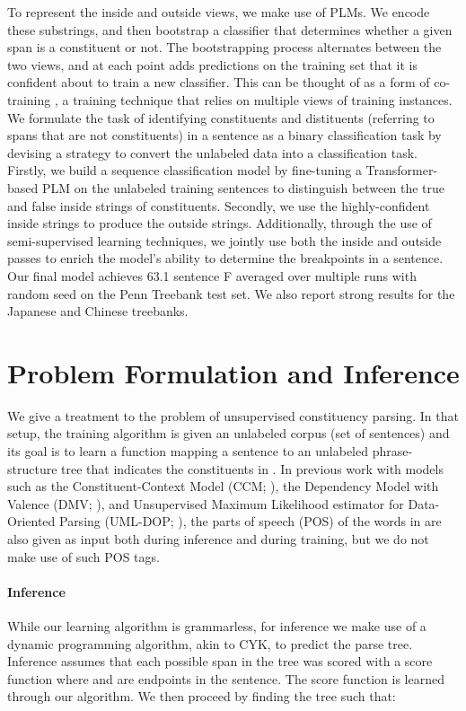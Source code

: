 \documentclass[11pt]{article}
\begin{document}
To represent the inside and outside views, we make use of PLMs. We encode these substrings, and then bootstrap a classifier that determines whether a given span is a constituent or not. The bootstrapping process alternates between the two views, and at each point adds predictions on the training set that it is confident about to train a new classifier. This can be thought of as a form of co-training \citep{yarowsky-1995-unsupervised, 10.1145/279943.279962}, a training technique that relies on multiple views of training instances.
We formulate the task of identifying constituents and distituents (referring to spans that are not constituents) in a sentence as a binary classification task by devising a strategy to convert the unlabeled data into a classification task. Firstly, we build a sequence classification model by fine-tuning a Transformer-based PLM on the unlabeled training sentences to distinguish between the true and false inside strings of constituents. Secondly, we use the highly-confident inside strings to produce the outside strings. Additionally, through the use of semi-supervised learning techniques, we jointly use both the inside and outside passes to enrich the model's ability to determine the breakpoints in a sentence. Our final model achieves 63.1 sentence F averaged over multiple runs with random seed on the Penn Treebank test set. 
We also report strong results for the Japanese and Chinese treebanks.
%
 \section{Problem Formulation and Inference}
\label{sec:Parsing-Algorithm}

We give a treatment to the problem of unsupervised constituency parsing. In that setup, the training algorithm is given an unlabeled corpus (set of sentences) and its goal is to learn a function mapping a sentence  to an unlabeled phrase-structure tree  that indicates the constituents in . In previous work with models such as the Constituent-Context Model (CCM; \citealt{klein-manning-2002-generative}), the Dependency Model with Valence (DMV; \citealt{Klein2005NaturalLG}), and Unsupervised Maximum
Likelihood estimator for Data-Oriented Parsing (UML-DOP; \citealt{bod-2006-subtrees}), the parts of speech (POS) of the words in  are also given as input both during inference and during training, but we do not make use of such POS tags.

\paragraph{Inference}
While our learning algorithm is grammarless, for inference we make use of a dynamic programming algorithm, akin to CYK, to predict the parse tree. Inference assumes that each possible span in the tree was scored with a score function  where  and  are endpoints in the sentence. The score function is learned through our algorithm. We then proceed by finding the tree  such that:
\end{document}
